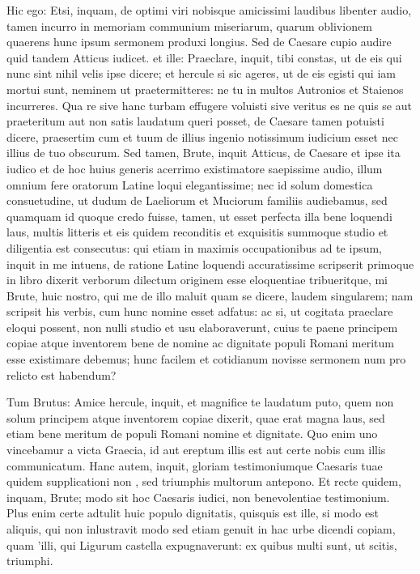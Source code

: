  Hic ego: Etsi, inquam, de optimi viri nobisque amicissimi laudibus libenter audio, tamen incurro in memoriam communium miseriarum, quarum oblivionem quaerens hunc ipsum sermonem produxi longius. Sed de Caesare cupio audire quid tandem Atticus iudicet. et ille: Praeclare, inquit, tibi constas, ut de eis qui nunc sint nihil velis ipse dicere; et hercule si sic ageres, ut de eis egisti qui iam mortui sunt, neminem ut praetermitteres: ne tu in multos Autronios et Staienos incurreres. Qua re sive hanc turbam effugere voluisti sive veritus es ne quis se aut praeteritum aut non satis laudatum queri posset, de Caesare tamen potuisti dicere, praesertim cum et tuum de illius ingenio notissimum iudicium esset nec illius de tuo obscurum. Sed tamen, Brute, inquit Atticus, de Caesare et ipse ita iudico et de hoc huius generis acerrimo existimatore saepissime audio, illum omnium fere oratorum Latine loqui elegantissime; nec id solum domestica consuetudine, ut dudum de Laeliorum et Muciorum familiis audiebamus, sed quamquam id quoque credo fuisse, tamen, ut esset perfecta illa bene loquendi laus, multis litteris et eis quidem reconditis et exquisitis summoque studio et diligentia est consecutus: qui etiam in maximis occupationibus ad te ipsum, inquit in me intuens, de ratione Latine loquendi accuratissime scripserit primoque in libro dixerit verborum dilectum originem esse eloquentiae tribueritque, mi Brute, huic nostro, qui me de illo maluit quam se dicere, laudem singularem; nam scripsit his verbis, cum hunc nomine esset adfatus: ac si, ut cogitata praeclare eloqui possent, non nulli studio et usu elaboraverunt, cuius te paene principem copiae atque inventorem bene de nomine ac dignitate populi Romani meritum esse existimare debemus; hunc facilem et cotidianum novisse sermonem num pro relicto est habendum?

 Tum Brutus: Amice hercule, inquit, et magnifice te laudatum puto, quem non solum principem atque inventorem copiae dixerit, quae erat magna laus, sed etiam bene meritum de populi Romani nomine et dignitate. Quo enim uno vincebamur a victa Graecia, id aut ereptum illis est aut certe nobis cum illis communicatum. Hanc autem, inquit, gloriam testimoniumque Caesaris tuae quidem supplicationi non , sed triumphis multorum antepono. Et recte quidem, inquam, Brute; modo sit hoc Caesaris iudici, non benevolentiae testimonium. Plus enim certe adtulit huic populo dignitatis, quisquis est ille, si modo est aliquis, qui non inlustravit modo sed etiam genuit in hac urbe dicendi copiam, quam 'illi, qui Ligurum castella expugnaverunt: ex quibus multi sunt, ut scitis, triumphi.

